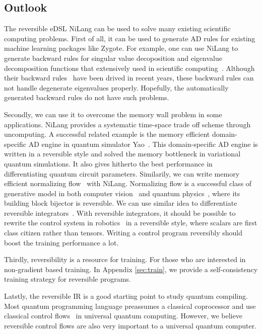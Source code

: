 \documentclass[aps,twocolumn,longbibliography,english,superscriptaddress]{revtex4-1}
\newcommand{\<}{\langle}
\renewcommand{\>}{\rangle}
\newcommand{\App}[1]{Appendix \ref{#1}}
\theoremstyle{definition}\newtheorem{definition}{\textit{Definition}}
\begin{document}
\subsection{Outlook}\label{sec:outlook}
The reversible eDSL NiLang can be used to solve many existing scientific computing problems.
First of all, it can be used to generate AD rules for existing machine learning packages like Zygote.
For example, one can use NiLang to generate backward rules for singular value decoposition and eigenvalue decomposition functions that extensively used in scientific computing~\cite{Xie2020,Liao2019}.
Although their backward rules~\cite{Seeger2017,Wan2019,Hubig2019} have been drived in recent years, these backward rules can not handle degenerate eigenvalues properly. Hopefully, the automatically generated backward rules do not have such problems.

Secondly, we can use it to overcome the memory wall problem in some applications.
NiLang provides a systematic time-space trade off scheme through uncomputing.
A successful related example is the memory efficient domain-specific AD engine in quantum simulator Yao~\cite{Luo2019}.
This domain-specific AD engine is written in a reversible style and solved the memory bottleneck in variational quantum simulations. It also gives hitherto the best performance in differentiating quantum circuit parameters.
Similarily, we can write memory efficient normalizing flow~\cite{Kobyzev2019} with NiLang. Normalizing flow is a successful class of generative model in both computer vision~\cite{Kingma2018} and quantum physics~\cite{Dinh2016,Li2018}, where its building block bijector is reversible.
We can use similar idea to differentiate reversible integrators~\cite{Hut1995, Laikov2018}.
With reversible integrators, it should be possible to rewrite the control system in robotics~\cite{Giftthaler2017} in a reversible style, where scalars are first class citizen rather than tensors.
Writing a control program reversibly should boost the training performance a lot.

Thirdly, reversibility is a resource for training.
For those who are interested in non-gradient based training. In \App{sec:train}, we provide a self-consistency training strategy for reversible programs.

Latstly, the reversible IR is a good starting point to study quantum compiling. Most quantum programming language preassumes a classical coprocessor and use classical control flows~\cite{Svore2018} in universal quantum computing.
However, we believe reversible control flows are also very important to a universal quantum computer.
\end{document}
